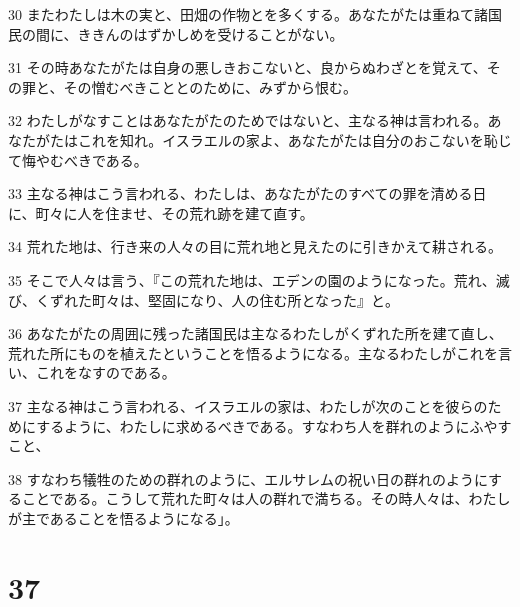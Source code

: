 \par 30 またわたしは木の実と、田畑の作物とを多くする。あなたがたは重ねて諸国民の間に、ききんのはずかしめを受けることがない。
\par 31 その時あなたがたは自身の悪しきおこないと、良からぬわざとを覚えて、その罪と、その憎むべきこととのために、みずから恨む。
\par 32 わたしがなすことはあなたがたのためではないと、主なる神は言われる。あなたがたはこれを知れ。イスラエルの家よ、あなたがたは自分のおこないを恥じて悔やむべきである。
\par 33 主なる神はこう言われる、わたしは、あなたがたのすべての罪を清める日に、町々に人を住ませ、その荒れ跡を建て直す。
\par 34 荒れた地は、行き来の人々の目に荒れ地と見えたのに引きかえて耕される。
\par 35 そこで人々は言う、『この荒れた地は、エデンの園のようになった。荒れ、滅び、くずれた町々は、堅固になり、人の住む所となった』と。
\par 36 あなたがたの周囲に残った諸国民は主なるわたしがくずれた所を建て直し、荒れた所にものを植えたということを悟るようになる。主なるわたしがこれを言い、これをなすのである。
\par 37 主なる神はこう言われる、イスラエルの家は、わたしが次のことを彼らのためにするように、わたしに求めるべきである。すなわち人を群れのようにふやすこと、
\par 38 すなわち犠牲のための群れのように、エルサレムの祝い日の群れのようにすることである。こうして荒れた町々は人の群れで満ちる。その時人々は、わたしが主であることを悟るようになる」。

\chapter{37}


